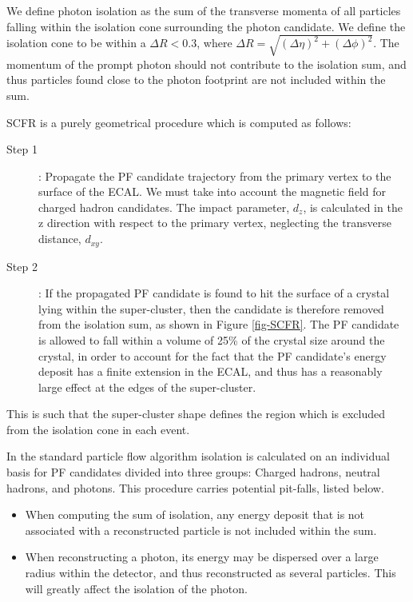We define photon isolation as the sum of the transverse momenta of all particles falling within the isolation cone surrounding the photon candidate. We define the isolation cone to be within a $\Delta R < 0.3$, where $\Delta R = \sqrt{(\Delta\eta)^2+(\Delta\phi)^2}$. The momentum of the prompt photon should not contribute to the isolation sum, and thus particles found close to the photon footprint are not included within the sum. 

SCFR is a purely geometrical procedure which is computed as follows:

\begin{description}
	\item[Step 1]: Propagate the PF candidate trajectory from the primary vertex to the surface of the ECAL. We must take into account the magnetic field for charged hadron candidates. The impact parameter, $d_z$, is calculated in the z direction with respect to the primary vertex, neglecting the transverse distance, $d_{xy}$. 
	\item[Step 2]: If the propagated PF candidate is found to hit the surface of a crystal lying within the super-cluster, then the candidate is therefore removed from the isolation sum, as shown in Figure \ref{fig-SCFR}. The PF candidate is allowed to fall within a volume of 25\% of the crystal size around the crystal, in order to account for the fact that the PF candidate's energy deposit has a finite extension in the ECAL, and thus has a reasonably large effect at the edges of the super-cluster. 
\end{description}

This is such that the super-cluster shape defines the region which is excluded from the isolation cone in each event.

In the standard particle flow algorithm isolation is calculated on an individual basis for PF candidates divided into three groups: Charged hadrons, neutral hadrons, and photons. This procedure carries potential pit-falls, listed below.

\begin{itemize}
	\item When computing the sum of isolation, any energy deposit that is not associated with a reconstructed particle is not included within the sum.  
	\item When reconstructing a photon, its energy may be dispersed over a large radius within the detector, and thus reconstructed as several particles. This will greatly affect the isolation of the photon.
\end{itemize}

